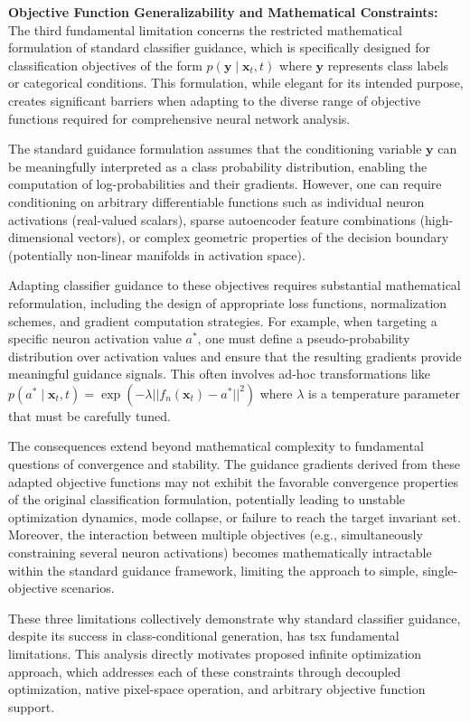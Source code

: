 \documentclass[licencjacka,en]{pracamgr}
\begin{document}
\textbf{Objective Function Generalizability and Mathematical Constraints:} The third fundamental limitation concerns the restricted mathematical formulation of standard classifier guidance, which is specifically designed for classification objectives of the form $p(\mathbf{y} \mid \mathbf{x}_t, t)$ where $\mathbf{y}$ represents class labels or categorical conditions. This formulation, while elegant for its intended purpose, creates significant barriers when adapting to the diverse range of objective functions required for comprehensive neural network analysis.

The standard guidance formulation assumes that the conditioning variable $\mathbf{y}$ can be meaningfully interpreted as a class probability distribution, enabling the computation of log-probabilities and their gradients. However, one can require conditioning on arbitrary differentiable functions such as individual neuron activations (real-valued scalars), sparse autoencoder feature combinations (high-dimensional vectors), or complex geometric properties of the decision boundary (potentially non-linear manifolds in activation space).

Adapting classifier guidance to these objectives requires substantial mathematical reformulation, including the design of appropriate loss functions, normalization schemes, and gradient computation strategies. For example, when targeting a specific neuron activation value $a^*$, one must define a pseudo-probability distribution over activation values and ensure that the resulting gradients provide meaningful guidance signals. This often involves ad-hoc transformations like $p(a^* \mid \mathbf{x}_t, t) = \exp(-\lambda ||f_n(\mathbf{x}_t) - a^*||^2)$ where $\lambda$ is a temperature parameter that must be carefully tuned.

The consequences extend beyond mathematical complexity to fundamental questions of convergence and stability. The guidance gradients derived from these adapted objective functions may not exhibit the favorable convergence properties of the original classification formulation, potentially leading to unstable optimization dynamics, mode collapse, or failure to reach the target invariant set. Moreover, the interaction between multiple objectives (e.g., simultaneously constraining several neuron activations) becomes mathematically intractable within the standard guidance framework, limiting the approach to simple, single-objective scenarios.

These three limitations collectively demonstrate why standard classifier guidance, despite its success in class-conditional generation, has tsx fundamental limitations. This analysis directly motivates proposed infinite optimization approach, which addresses each of these constraints through decoupled optimization, native pixel-space operation, and arbitrary objective function support.
\end{document}
